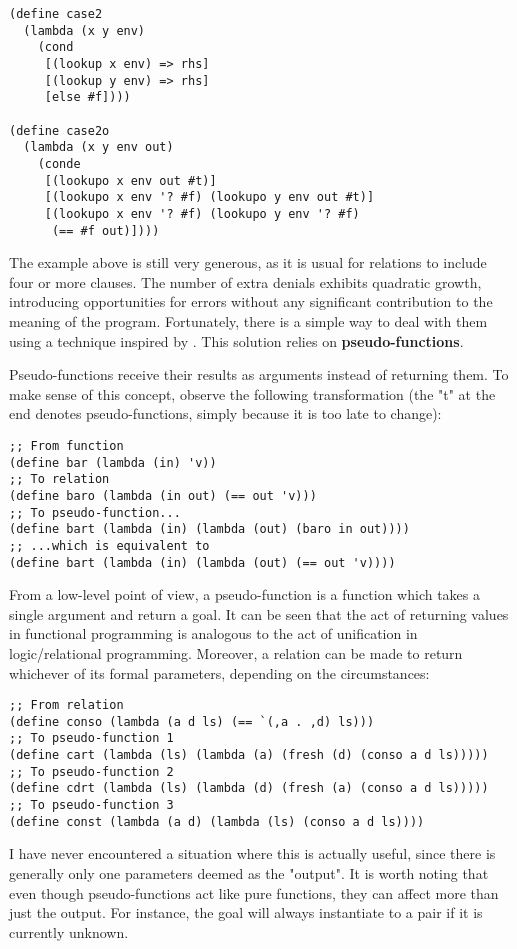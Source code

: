 \begin{lstlisting}
(define case2
  (lambda (x y env)
    (cond
     [(lookup x env) => rhs]
     [(lookup y env) => rhs]
     [else #f])))

(define case2o
  (lambda (x y env out)
    (conde
     [(lookupo x env out #t)]
     [(lookupo x env '? #f) (lookupo y env out #t)]
     [(lookupo x env '? #f) (lookupo y env '? #f)
      (== #f out)])))
\end{lstlisting}

The example above is still very generous, as it is usual for relations to include four or more  clauses. The number of extra denials exhibits quadratic growth, introducing opportunities for errors without any significant contribution to the meaning of the program. Fortunately, there is a simple way to deal with them using a technique inspired by \textcite{reif}. This solution relies on \textbf{pseudo-functions}.

Pseudo-functions receive their results as arguments instead of returning them. To make sense of this concept, observe the following transformation (the "t" at the end denotes pseudo-functions, simply because it is too late to change):
\begin{lstlisting}
;; From function
(define bar (lambda (in) 'v))
;; To relation
(define baro (lambda (in out) (== out 'v)))
;; To pseudo-function...
(define bart (lambda (in) (lambda (out) (baro in out))))
;; ...which is equivalent to
(define bart (lambda (in) (lambda (out) (== out 'v))))
\end{lstlisting}

From a low-level point of view, a pseudo-function is a function which takes a single argument and return a goal. It can be seen that the act of returning values in functional programming is analogous to the act of unification in logic/relational programming. Moreover, a relation can be made to return whichever of its formal parameters, depending on the circumstances:
\begin{lstlisting}
;; From relation
(define conso (lambda (a d ls) (== `(,a . ,d) ls)))
;; To pseudo-function 1
(define cart (lambda (ls) (lambda (a) (fresh (d) (conso a d ls)))))
;; To pseudo-function 2
(define cdrt (lambda (ls) (lambda (d) (fresh (a) (conso a d ls)))))
;; To pseudo-function 3
(define const (lambda (a d) (lambda (ls) (conso a d ls))))
\end{lstlisting}
I have never encountered a situation where this is actually useful, since there is generally only one parameters deemed as the "output". It is worth noting that even though pseudo-functions act like pure functions, they can affect more than just the output. For instance, the goal  will always instantiate  to a pair if it is currently unknown.

